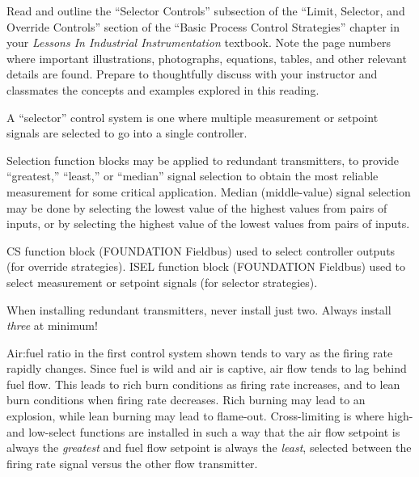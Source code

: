 

Read and outline the ``Selector Controls'' subsection of the ``Limit, Selector, and Override Controls'' section of the ``Basic Process Control Strategies'' chapter in your {\it Lessons In Industrial Instrumentation} textbook.  Note the page numbers where important illustrations, photographs, equations, tables, and other relevant details are found.  Prepare to thoughtfully discuss with your instructor and classmates the concepts and examples explored in this reading.














A ``selector'' control system is one where multiple measurement or setpoint signals are selected to go into a single controller.

Selection function blocks may be applied to redundant transmitters, to provide ``greatest,'' ``least,'' or ``median'' signal selection to obtain the most reliable measurement for some critical application.  Median (middle-value) signal selection may be done by selecting the lowest value of the highest values from pairs of inputs, or by selecting the highest value of the lowest values from pairs of inputs.

\vskip 10pt

CS function block (FOUNDATION Fieldbus) used to select controller outputs (for override strategies).  ISEL function block (FOUNDATION Fieldbus) used to select measurement or setpoint signals (for selector strategies).

When installing redundant transmitters, never install just two.  Always install {\it three} at minimum!

\vskip 10pt

Air:fuel ratio in the first control system shown tends to vary as the firing rate rapidly changes.  Since fuel is wild and air is captive, air flow tends to lag behind fuel flow.  This leads to rich burn conditions as firing rate increases, and to lean burn conditions when firing rate decreases.  Rich burning may lead to an explosion, while lean burning may lead to flame-out.  Cross-limiting is where high- and low-select functions are installed in such a way that the air flow setpoint is always the {\it greatest} and fuel flow setpoint is always the {\it least}, selected between the firing rate signal versus the other flow transmitter.

